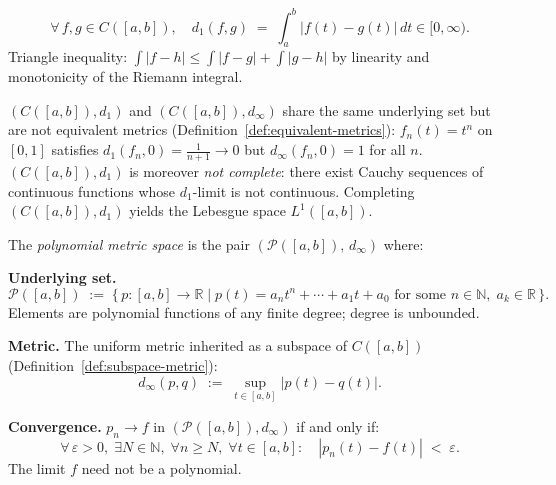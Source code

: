 \begin{remark*}
\[
\forall\, f, g \in C([a,b]), \quad
d_1(f,g) \;=\; \int_a^b |f(t) - g(t)|\,dt \in [0,\infty).
\]
Triangle inequality: $\int|f-h|\le\int|f-g|+\int|g-h|$ by linearity and
monotonicity of the Riemann integral.
\end{remark*}

\begin{remark*}
$(C([a,b]), d_1)$ and $(C([a,b]), d_\infty)$ share the same underlying set
but are not equivalent metrics (Definition~\ref{def:equivalent-metrics}):
$f_n(t) = t^n$ on $[0,1]$ satisfies $d_1(f_n, 0) = \frac{1}{n+1} \to 0$
but $d_\infty(f_n, 0) = 1$ for all $n$.
$(C([a,b]), d_1)$ is moreover \emph{not complete}: there exist Cauchy
sequences of continuous functions whose $d_1$-limit is not continuous.
Completing $(C([a,b]), d_1)$ yields the Lebesgue space $L^1([a,b])$.
\end{remark*}


\begin{tcolorbox}[colback=propbox, colframe=propborder, arc=2pt,
  left=6pt, right=6pt, top=4pt, bottom=4pt,
  title={\small\textbf{Definition (Polynomial Space $\mathcal{P}([a,b])$)}},
  fonttitle=\small\bfseries]
\begin{definition}
\label{def:poly-space}
The \emph{polynomial metric space} is the pair
$(\mathcal{P}([a,b]),\, d_\infty)$ where:

\medskip
\noindent\textbf{Underlying set.}
\[
\mathcal{P}([a,b]) \;:=\;
\bigl\{\,p : [a,b] \to \mathbb{R} \mid
p(t) = a_n t^n + \cdots + a_1 t + a_0
\text{ for some } n \in \mathbb{N},\; a_k \in \mathbb{R}\,\bigr\}.
\]
Elements are polynomial functions of any finite degree; degree is unbounded.

\medskip
\noindent\textbf{Metric.}\quad
The uniform metric inherited as a subspace of $C([a,b])$
(Definition~\ref{def:subspace-metric}):
\[
d_\infty(p,q) \;:=\; \sup_{t \in [a,b]}|p(t) - q(t)|.
\]

\medskip
\noindent\textbf{Convergence.}\quad
$p_n \to f$ in $(\mathcal{P}([a,b]), d_\infty)$ if and only if:
\[
\forall\,\varepsilon > 0,\;\exists N \in \mathbb{N},\;
\forall n \ge N,\;\forall t \in [a,b]:\quad
|p_n(t) - f(t)| \;<\; \varepsilon.
\]
The limit $f$ need not be a polynomial.
\end{definition}
\end{tcolorbox}

